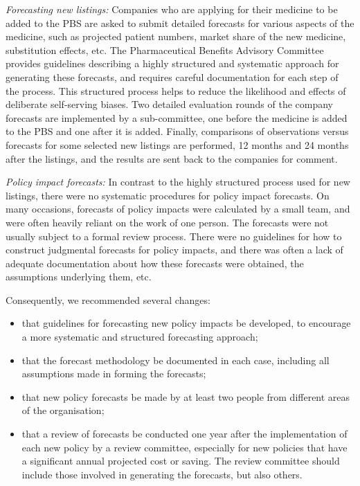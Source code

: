 \documentclass[]{book}
\providecommand{\tightlist}{%
  \setlength{\itemsep}{0pt}\setlength{\parskip}{0pt}}
\begin{document}
\emph{Forecasting new listings:} Companies who are applying for their medicine to be added to the PBS are asked to submit detailed forecasts for various aspects of the medicine, such as projected patient numbers, market share of the new medicine, substitution effects, etc. The Pharmaceutical Benefits Advisory Committee provides guidelines describing a highly structured and systematic approach for generating these forecasts, and requires careful documentation for each step of the process. This structured process helps to reduce the likelihood and effects of deliberate self-serving biases. Two detailed evaluation rounds of the company forecasts are implemented by a sub-committee, one before the medicine is added to the PBS and one after it is added. Finally, comparisons of observations versus forecasts for some selected new listings are performed, 12 months and 24 months after the listings, and the results are sent back to the companies for comment.

\emph{Policy impact forecasts:} In contrast to the highly structured process used for new listings, there were no systematic procedures for policy impact forecasts. On many occasions, forecasts of policy impacts were calculated by a small team, and were often heavily reliant on the work of one person. The forecasts were not usually subject to a formal review process. There were no guidelines for how to construct judgmental forecasts for policy impacts, and there was often a lack of adequate documentation about how these forecasts were obtained, the assumptions underlying them, etc.

Consequently, we recommended several changes:

\begin{itemize}
\tightlist
\item
  that guidelines for forecasting new policy impacts be developed, to encourage a more systematic and structured forecasting approach;
\item
  that the forecast methodology be documented in each case, including all assumptions made in forming the forecasts;
\item
  that new policy forecasts be made by at least two people from different areas of the organisation;
\item
  that a review of forecasts be conducted one year after the implementation of each new policy by a review committee, especially for new policies that have a significant annual projected cost or saving. The review committee should include those involved in generating the forecasts, but also others.
\end{itemize}
\end{document}
